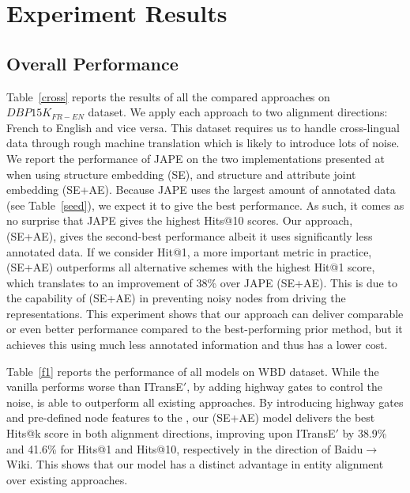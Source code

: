 \section{Experiment Results\label{sec:results}}



\subsection{Overall Performance\label{overall}}

 Table~\ref{cross} reports the results of all the compared approaches on $DBP15K_{FR-EN}$
dataset. We apply each approach
 to two alignment directions: French to English and vice versa. This dataset requires us to handle
cross-lingual data through rough machine translation which is likely to introduce lots of noise. We report the performance of JAPE on the
two implementations presented at
 ~\cite{sun2017cross} when using structure embedding (SE), and structure and attribute joint embedding (SE+AE).
Because JAPE uses the largest amount of annotated data (see Table~\ref {seed}), we expect it to give the best performance. As such, it
comes as no surprise that JAPE gives the highest Hits@10 scores. Our approach, \HRGCN (SE+AE), gives the second-best performance albeit it
uses significantly less annotated data. If we consider  Hit@1, a more important metric in practice, \HRGCN (SE+AE) outperforms all
alternative schemes with the highest Hit@1 score, which translates to an improvement of 38\% over JAPE (SE+AE). This is due to the
capability of \HRGCN (SE+AE) in preventing noisy nodes from driving the \KG representations. This experiment shows that our approach can
deliver comparable or even better performance compared to the best-performing prior method, but it achieves this using much less annotated
information and thus has a lower cost.



 Table~\ref{f1} reports the performance of all models on WBD dataset. While the vanilla \GCN performs worse than
ITransE$'$, by adding highway gates to control the noise, \HGCN is able to outperform all existing approaches. By introducing highway gates
and pre-defined node features to the \RGCN, our \HRGCN (SE+AE) model delivers the best Hits@k score in both alignment directions, improving
upon ITransE$'$ by 38.9\% and 41.6\% for Hits@1 and Hits@10, respectively in the direction of Baidu$\rightarrow$Wiki. This shows that our
model has a distinct advantage in entity alignment over existing approaches.

